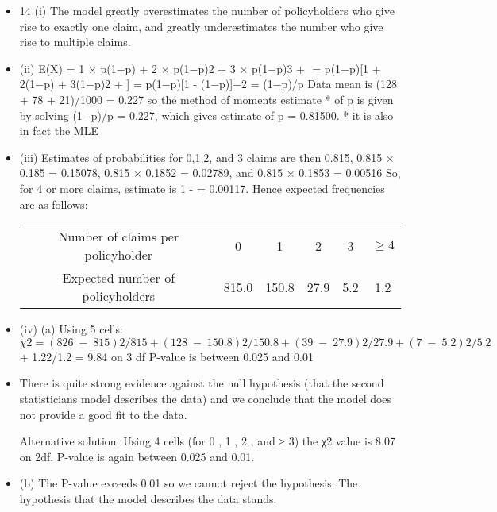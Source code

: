 \documentclass[a4paper,12pt]{article}
\begin{document}
\begin{itemize}
    \item 14 (i) The model greatly overestimates the number of policyholders who give
rise to exactly one claim, and greatly underestimates the number who give
rise to multiple claims.
\item (ii) E(X) = 1 × p(1−p) + 2 × p(1−p)2 + 3 × p(1−p)3 + 
= p(1−p)[1 + 2(1−p) + 3(1−p)2 + ] = p(1−p)[1 \;-\; (1−p)]−2 = (1−p)/p
Data mean is (128 + 78 + 21)/1000 = 0.227
so the method of moments estimate * of p is given by solving
(1−p)/p = 0.227, which gives estimate of p = 0.81500.
* it is also in fact the MLE
\item (iii) Estimates of probabilities for 0,1,2, and 3 claims are then 0.815,
0.815 × 0.185 = 0.15078, 0.815 × 0.1852 = 0.02789, and
0.815 × 0.1853 = 0.00516
So, for 4 or more claims, estimate is 1 \;- = 0.00117.
Hence expected frequencies are as follows:
\begin{tabular}{c|c|c|c|c|c|}
Number of claims per policyholder  & 0 & 1 & 2 & 3 & $\geq 4$ \\
Expected number of policyholders &  815.0 & 150.8 & 27.9 & 5.2&  1.2 \\ 
\end{tabular}

\item (iv) (a) Using 5 cells:
\[ χ2 = (826\;-\;815)2/815+(128\;-\;150.8)2/150.8+(39\;-\;27.9)2/27.9 +(7\;-\;5.2)2/5.2\]
+ 1.22/1.2 = 9.84 on 3 df
P-value is between 0.025 and 0.01
\item There is quite strong evidence against the null hypothesis (that the
second statisticians model describes the data) and we conclude that
the model does not provide a good fit to the data.
\item [Alternative solution: Using 4 cells (for 0 , 1 , 2 , and ≥ 3) the χ2 value
is 8.07 on 2df. P-value is again between 0.025 and 0.01.]
\item (b) The P-value exceeds 0.01 so we cannot reject the hypothesis.
The hypothesis that the model describes the data stands.
\end{itemize}
\end{document}
